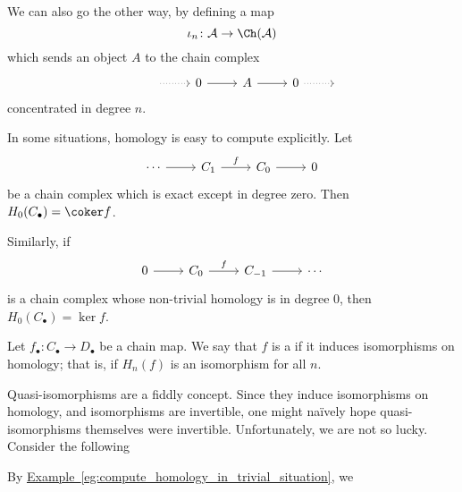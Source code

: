 \documentclass[main.tex]{subfiles}
\begin{document}
We can also go the other way, by defining a map
\begin{equation*}
  \iota_{n}\colon \mathcal{A} \to \Ch(\mathcal{A})
\end{equation*}
which sends an object $A$ to the chain complex
\begin{equation*}
  \begin{tikzcd}
    &{\ }
    \arrow[r, dotted]
    & 0
    \arrow[r]
    & A
    \arrow[r]
    & 0
    \arrow[r, dotted]
    &{\ }
  \end{tikzcd}
\end{equation*}
concentrated in degree $n$.

\begin{example}
  \label{eg:compute_homology_in_trivial_situation}
  In some situations, homology is easy to compute explicitly. Let
  \begin{equation*}
    \begin{tikzcd}
      \cdots
      \arrow[r]
      & C_{1}
      \arrow[r, "f"]
      & C_{0}
      \arrow[r]
      & 0
    \end{tikzcd}
  \end{equation*}
  be a chain complex which is exact except in degree zero. Then $H_{0}(C_{\bullet}) = \coker f$.

  Similarly, if
  \begin{equation*}
    \begin{tikzcd}
      0
      \arrow[r]
      & C_{0}
      \arrow[r, "f"]
      & C_{-1}
      \arrow[r]
      & \cdots
    \end{tikzcd}
  \end{equation*}
  is a chain complex whose non-trivial homology is in degree $0$, then $H_{0}(C_{\bullet}) = \ker f$.
\end{example}

\begin{definition}
  \label{def:quasi_isomorphism}
  Let $f_{\bullet}\colon C_{\bullet} \to D_{\bullet}$ be a chain map. We say that $f$ is a  if it induces isomorphisms on homology; that is, if $H_{n}(f)$ is an isomorphism for all $n$.
\end{definition}

Quasi-isomorphisms are a fiddly concept. Since they induce isomorphisms on homology, and isomorphisms are invertible, one might naïvely hope quasi-isomorphisms themselves were invertible. Unfortunately, we are not so lucky. Consider the following

By \hyperref[eg:compute_homology_in_trivial_situation]{Example~\ref*{eg:compute_homology_in_trivial_situation}}, we
\end{document}
